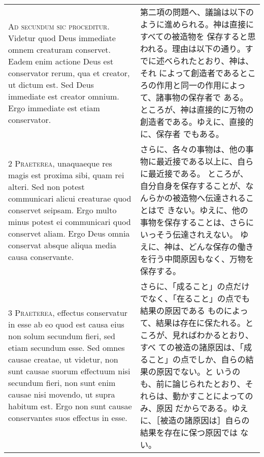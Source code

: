 \documentclass[10pt]{jsarticle} %
\begin{document}
\begin{longtable}{p{21em}p{21em}}



{\huge A}{\scshape d secundum sic proceditur}. Videtur quod
Deus immediate omnem creaturam conservet. Eadem enim actione Deus est
conservator rerum, qua et creator, ut dictum est. Sed Deus immediate est
creator omnium. Ergo immediate est etiam conservator.

&

第二項の問題へ、議論は以下のように進められる。神は直接にすべての被造物を
保存すると思われる。理由は以下の通り。すでに述べられたとおり、神は、それ
によって創造者であるところの作用と同一の作用によって、諸事物の保存者で
ある。ところが、神は直接的に万物の創造者である。ゆえに、直接的に、保存者
 でもある。

\\


{\scshape 2 Praeterea}, unaquaeque res magis est
proxima sibi, quam rei alteri. Sed non potest communicari alicui
creaturae quod conservet seipsam. Ergo multo minus potest ei communicari
quod conservet aliam. Ergo Deus omnia conservat absque aliqua media
causa conservante.

&

さらに、各々の事物は、他の事物に最近接である以上に、自らに最近接である。
 ところが、自分自身を保存することが、なんらかの被造物へ伝達されることはで
 きない。ゆえに、他の事物を保存することは、さらにいっそう伝達されえない。
 ゆえに、神は、どんな保存の働きを行う中間原因もなく、万物を保存する。


\\


{\scshape 3 Praeterea}, effectus conservatur in esse ab
eo quod est causa eius non solum secundum fieri, sed etiam secundum
esse. Sed omnes causae creatae, ut videtur, non sunt causae suorum
effectuum nisi secundum fieri, non sunt enim causae nisi movendo, ut
supra habitum est. Ergo non sunt causae conservantes suos effectus in
esse.

&

さらに、「成ること」の点だけでなく、「在ること」の点でも結果の原因である
 ものによって、結果は存在に保たれる。ところが、見ればわかるとおり、すべ
 ての被造の諸原因は、「成ること」の点でしか、自らの結果の原因でない。と
 いうのも、前に論じられたとおり、それらは、動かすことによってのみ、原因
 だからである。ゆえに、［被造の諸原因は］自らの結果を存在に保つ原因では
 ない。

\\



\end{longtable}
\end{document}
